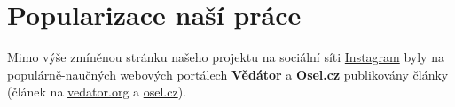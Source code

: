\documentclass{article} %
\begin{document}
            \section{Popularizace naší práce}
                Mimo výše zmíněnou stránku našeho projektu na sociální síti \href{https://www.instagram.com/smart_hangar/}{Instagram} byly na populárně-naučných webových portálech \textbf{Vědátor} a \textbf{Osel.cz} publikovány články (článek na \href{https://vedator.org/2024/08/autonomni-drony-vznikaji-uz-i-v-cesku-jeden-kuti-v-brne/}{vedator.org} a \href{https://www.osel.cz/13580-autonomni-hnizdo-inovativni-hangar-z-vut-prinasi-technologickou-revoluci.html}{osel.cz}).
\end{document}
